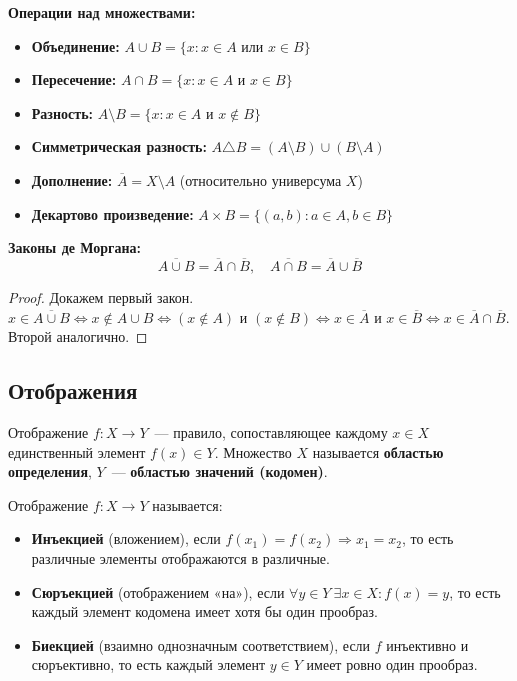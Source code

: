 \documentclass[12pt]{article}
\begin{document}
	\textbf{Операции над множествами:}
	\begin{itemize}
		\item \textbf{Объединение:} $A \cup B = \{x : x \in A \text{ или } x \in B\}$
		\item \textbf{Пересечение:} $A \cap B = \{x : x \in A \text{ и } x \in B\}$
		\item \textbf{Разность:} $A \setminus B = \{x : x \in A \text{ и } x \notin B\}$
		\item \textbf{Симметрическая разность:} $A \triangle B = (A \setminus B) \cup (B \setminus A)$
		\item \textbf{Дополнение:} $\overline{A} = X \setminus A$ (относительно универсума $X$)
		\item \textbf{Декартово произведение:} $A \times B = \{(a, b) : a \in A, b \in B\}$
	\end{itemize}
	
	\textbf{Законы де Моргана:}
	\[\overline{A \cup B} = \overline{A} \cap \overline{B}, \quad \overline{A \cap B} = \overline{A} \cup \overline{B}\]
	
	\begin{proof}
		Докажем первый закон. $x \in \overline{A \cup B} \Leftrightarrow x \notin A \cup B \Leftrightarrow (x \notin A) \text{ и } (x \notin B) \Leftrightarrow x \in \overline{A} \text{ и } x \in \overline{B} \Leftrightarrow x \in \overline{A} \cap \overline{B}$. Второй аналогично.
	\end{proof}
	
	\subsection{Отображения}
	
	\begin{definition}
		Отображение $f: X \to Y$~--- правило, сопоставляющее каждому $x \in X$ единственный элемент $f(x) \in Y$. Множество $X$ называется \textbf{областью определения}, $Y$~--- \textbf{областью значений (кодомен)}.
	\end{definition}
	
	\begin{definition}
		Отображение $f: X \to Y$ называется:
		\begin{itemize}
			\item \textbf{Инъекцией} (вложением), если $f(x_1) = f(x_2) \Rightarrow x_1 = x_2$, то есть различные элементы отображаются в различные.
			\item \textbf{Сюръекцией} (отображением «на»), если $\forall y \in Y \ \exists x \in X: f(x) = y$, то есть каждый элемент кодомена имеет хотя бы один прообраз.
			\item \textbf{Биекцией} (взаимно однозначным соответствием), если $f$ инъективно и сюръективно, то есть каждый элемент $y \in Y$ имеет ровно один прообраз.
		\end{itemize}
	\end{definition}
	
\end{document}
